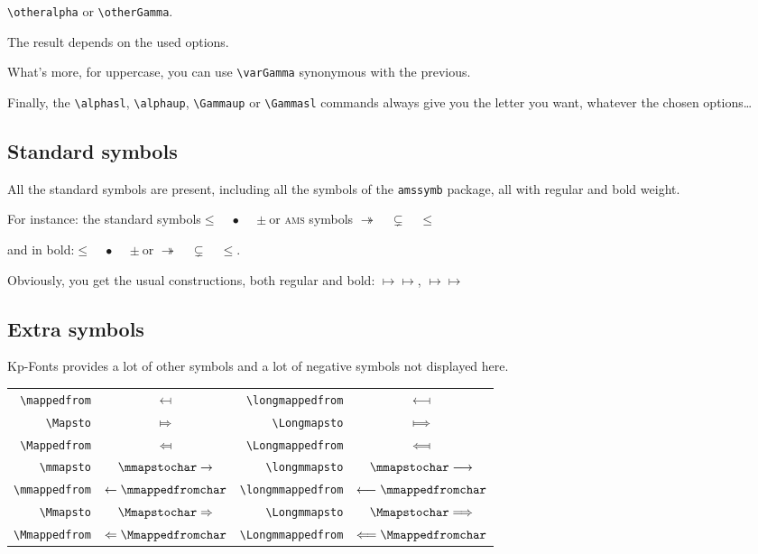\documentclass[a4paper,11pt]{article}
\begin{document}
\verb=\otheralpha= or \verb=\otherGamma=. 

The result depends on the used options.

What's more, for uppercase, you can use \verb=\varGamma= synonymous with the previous.

Finally, the \verb=\alphasl=, \verb=\alphaup=, \verb=\Gammaup= or \verb=\Gammasl= commands always give you the letter you want, whatever the chosen options\dots

\subsection{Standard symbols}

All the standard symbols are present, including all the symbols of the \texttt{amssymb} package, all with regular and bold weight.

For instance: the standard symbols\quad $\leq\quad\bullet\quad\pm$\quad or \textsc{ams} symbols \quad$\twoheadrightarrow\quad\subsetneq\quad\leqslant$

and in bold:\quad$\leq\quad\bullet\quad\pm$\quad or \quad$\twoheadrightarrow\quad\subsetneq\quad\leqslant$.

Obviously, you get the usual constructions, both regular and bold: \quad $\mapsto\longmapsto$,\quad
{}$\mapsto\longmapsto$

\subsection{Extra symbols}

Kp-Fonts provides a lot of other symbols and a lot of negative symbols not displayed here.


\begin{center}\begin{tabular}{r>{$}c<{$}|r>{$}c<{$}}

\verb=\mappedfrom=&\mappedfrom&\verb=\longmappedfrom=&\longmappedfrom\\
\verb=\Mapsto=&\Mapsto&\verb=\Longmapsto=&\Longmapsto\\
\verb=\Mappedfrom=&\Mappedfrom&\verb=\Longmappedfrom=&\Longmappedfrom\\
\verb=\mmapsto=&\mmapsto&\verb=\longmmapsto=&\longmmapsto\\
\verb=\mmappedfrom=&\mmappedfrom&\verb=\longmmappedfrom=&\longmmappedfrom\\
\verb=\Mmapsto=&\Mmapsto&\verb=\Longmmapsto=&\Longmmapsto\\
\verb=\Mmappedfrom=&\Mmappedfrom&\verb=\Longmmappedfrom=&\Longmmappedfrom\\

\end{tabular}\end{center}
\end{document}
